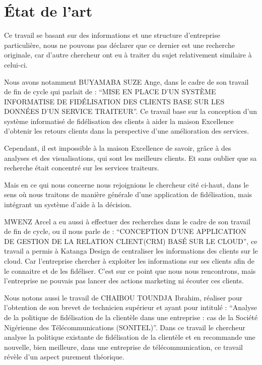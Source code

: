     \section[Etat de l'art]{État de l’art} %
    Ce travail se basant sur des informations et une structure d’entreprise particulière, nous ne
    pouvons pas déclarer que ce dernier est une recherche originale, car d’autre chercheur ont eu
    à traiter du sujet relativement similaire à celui-ci.
    \par
    Nous avons notamment BUYAMABA SUZE Ange, dans le cadre de son travail de fin de cycle
    qui parlait de : \enquote{MISE EN PLACE D’UN SYSTÈME INFORMATISE DE FIDÉLISATION DES 
    CLIENTS BASE SUR LES DONNÉES D’UN SERVICE TRAITEUR}. Ce travail base sur la conception
    d’un système informatisé de fidélisation des clients à aider la maison Excellence
    d’obtenir les retours clients dans la perspective d’une amélioration des services.
    \cite{Buyamba2017}
    \par
    Cependant, il est impossible à la maison Excellence de savoir, grâce à des analyses
    et des visualisations, qui sont les meilleurs clients. Et sans oublier que sa recherche
    était concentré sur les services traiteurs. 
    \par
    Mais en ce qui nous concerne nous rejoignions le chercheur cité ci-haut, dans le sens
    où nous traitons de manière générale d’une application de fidélisation, mais intégrant
    un système d’aide à la décision.
    \par
    MWENZ Arcel a eu aussi à effectuer des recherches
    dans le cadre de son  travail de fin de cycle, ou il nous parle de :
    \enquote{CONCEPTION D’UNE APPLICATION DE GESTION DE LA RELATION CLIENT(CRM) BASÉ SUR LE CLOUD},
    ce travail a permis à Katanga Design de centraliser les informations
    des clients sur le cloud. Car l’entreprise chercher à exploiter les
    informations sur ses clients afin de le connaitre et de les fidéliser. \cite*{Mwenz2017}
    C’est sur ce point que nous nous rencontrons, mais l’entreprise ne
    pouvais pas lancer des actions marketing ni écouter ces clients.
    \par
    Nous notons aussi le travail de CHAIBOU TOUNDJA Ibrahim, réaliser
    pour l’obtention de son brevet de technicien supérieur et ayant pour
    intitulé : \enquote{Analyse de la politique de fidélisation de la
    clientèle dans une entreprise : cas de la Société Nigérienne des
    Télécommunications (SONITEL)}. Dans ce travail le chercheur analyse
    la politique existante de fidélisation de la clientèle et en
    recommande une nouvelle, bien meilleure, dans une entreprise de
    télécommunication, ce travail révèle d’un aspect purement théorique. \cite*{chaibou2012sonitel} 


